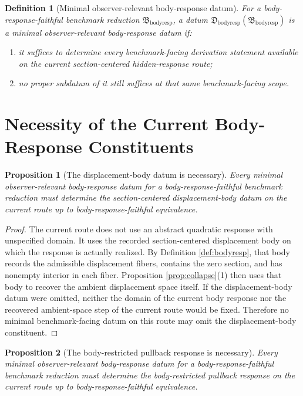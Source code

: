 \documentclass[11pt]{article}
\newcommand{\BodyResponseReduction}{\mathfrak B_{\mathrm{bodyresp}}}
\newcommand{\BodyResponseDatum}{\mathfrak D_{\mathrm{bodyresp}}}
\newtheorem{definition}{Definition}
\newtheorem{proposition}{Proposition}
\begin{document}
\begin{definition}[Minimal observer-relevant body-response datum]
\label{def:minimal}
For a body-response-faithful benchmark reduction \(\BodyResponseReduction\), a datum \(\BodyResponseDatum(\BodyResponseReduction)\) is a \emph{minimal observer-relevant body-response datum} if:
\begin{enumerate}
    \item it suffices to determine every benchmark-facing derivation statement available on the current section-centered hidden-response route;
    \item no proper subdatum of it still suffices at that same benchmark-facing scope.
\end{enumerate}
\end{definition}

\section{Necessity of the Current Body-Response Constituents}

\begin{proposition}[The displacement-body datum is necessary]
\label{prop:body}
Every minimal observer-relevant body-response datum for a body-response-faithful benchmark reduction must determine the section-centered displacement-body datum on the current route up to body-response-faithful equivalence.
\end{proposition}

\begin{proof}
The current route does not use an abstract quadratic response with unspecified domain. It uses the recorded section-centered displacement body on which the response is actually realized. By Definition \ref{def:bodyresp}, that body records the admissible displacement fibers, contains the zero section, and has nonempty interior in each fiber. Proposition \ref{prop:collapse}(1) then uses that body to recover the ambient displacement space itself. If the displacement-body datum were omitted, neither the domain of the current body response nor the recovered ambient-space step of the current route would be fixed. Therefore no minimal benchmark-facing datum on this route may omit the displacement-body constituent.
\end{proof}

\begin{proposition}[The body-restricted pullback response is necessary]
\label{prop:response}
Every minimal observer-relevant body-response datum for a body-response-faithful benchmark reduction must determine the body-restricted pullback response on the current route up to body-response-faithful equivalence.
\end{proposition}
\end{document}
